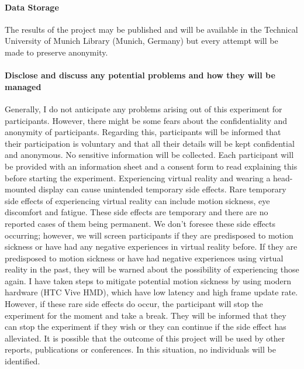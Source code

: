 \paragraph{Data Storage}

The results of the project may be published and will be available in the Technical University of Munich Library (Munich, Germany) but every attempt will be made to preserve anonymity.

\paragraph{Disclose and discuss any potential problems and how they will be managed}
Generally, I do not anticipate any problems arising out of this experiment for participants. However, there might be some fears about the confidentiality and anonymity of participants. Regarding this, participants will be informed that their participation is voluntary and that all their details will be kept confidential and anonymous. No sensitive information will be collected. Each participant will be provided with an information sheet and a consent form to read explaining this before starting the experiment. 
Experiencing virtual reality and wearing a head-mounted display can cause unintended temporary side effects. Rare temporary side effects of experiencing virtual reality can include motion sickness, eye discomfort and fatigue. These side effects are temporary and there are no reported cases of them being permanent. We don’t foresee these side effects occurring; however, we will screen participants if they are predisposed to motion sickness or have had any negative experiences in virtual reality before. If they are predisposed to motion sickness or have had negative experiences using virtual reality in the past, they will be warned about the possibility of experiencing those again. I have taken steps to mitigate potential motion sickness by using modern hardware (HTC Vive HMD), which have low latency and high frame update rate. However, if these rare side effects do occur, the participant will stop the experiment for the moment and take a break. They will be informed that they can stop the experiment if they wish or they can continue if the side effect has alleviated. 
It is possible that the outcome of this project will be used by other reports, publications or conferences. In this situation, no individuals will be identified. 
